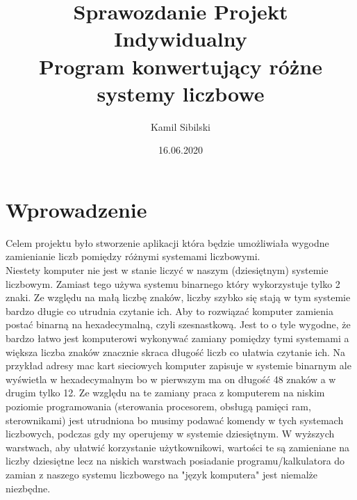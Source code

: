 \documentclass[11pt,a4paper]{article}
\title{%
Sprawozdanie Projekt Indywidualny \\
\large Program konwertujący różne systemy liczbowe}
\author{Kamil Sibilski}
\date{16.06.2020}
\begin{document}
\maketitle

\tableofcontents
\newpage

\section{Wprowadzenie}
Celem projektu było stworzenie aplikacji która będzie umożliwiała wygodne zamienianie liczb pomiędzy różnymi systemami liczbowymi.\\
Niestety komputer nie jest w stanie liczyć w naszym (dziesiętnym) systemie liczbowym. Zamiast tego używa systemu binarnego który wykorzystuje tylko 2 znaki. Ze względu na małą liczbę znaków, liczby szybko się stają w tym systemie bardzo długie co utrudnia czytanie ich. Aby to rozwiązać komputer zamienia postać binarną na hexadecymalną, czyli szesnastkową. Jest to o tyle wygodne, że bardzo łatwo jest komputerowi wykonywać zamiany pomiędzy tymi systemami a większa liczba znaków znacznie skraca długość liczb co ułatwia czytanie ich. Na przykład adresy mac kart sieciowych komputer zapisuje w systemie binarnym ale wyświetla w hexadecymalnym bo w pierwszym ma on długość 48 znaków a w drugim tylko 12. Ze względu na te zamiany praca z komputerem na niskim poziomie programowania (sterowania procesorem, obsługą pamięci ram, sterownikami) jest utrudniona bo musimy podawać komendy w tych systemach liczbowych, podczas gdy my operujemy w systemie dziesiętnym. W wyższych warstwach, aby ułatwić korzystanie użytkownikowi, wartości te są zamieniane na liczby dziesiętne lecz na niskich warstwach posiadanie programu/kalkulatora do zamian z naszego systemu liczbowego na "język komputera" jest niemalże niezbędne.\\
\end{document}
